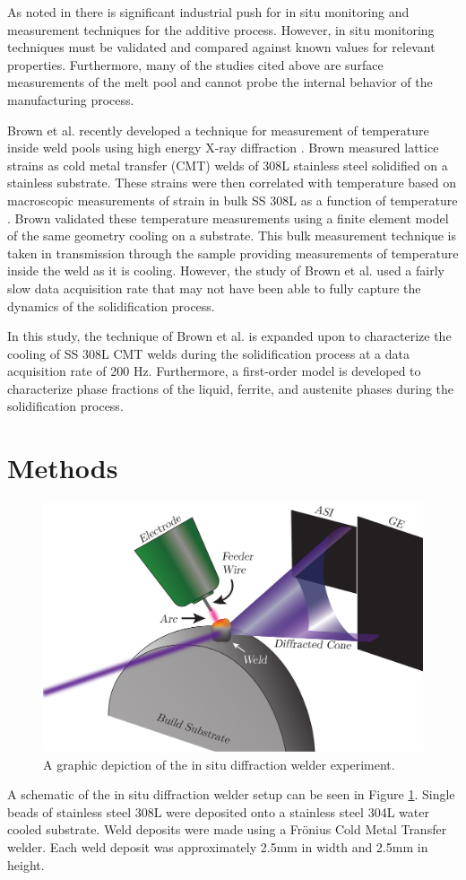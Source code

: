 \documentclass[twocolumn,nofootinbib,notitlepage,aps]{revtex4-1}
\begin{document}
As noted in \cite{Everton2016} there is significant industrial push for in situ monitoring and measurement techniques for the additive process. However, in situ monitoring techniques must be validated and compared against known values for relevant properties. Furthermore, many of the studies cited above are surface measurements of the melt pool and cannot probe the internal behavior of the manufacturing process.

Brown et al. recently developed a technique for measurement of temperature inside weld pools using high energy X-ray diffraction \cite{Brown2019}. Brown measured lattice strains as cold metal transfer (CMT) welds of 308L stainless steel solidified on a stainless substrate. These strains were then correlated with temperature based on macroscopic measurements of strain in bulk SS 308L as a function of temperature \cite{Touloukian1975}. Brown validated these temperature measurements using a finite element model of the same geometry cooling on a substrate. This bulk measurement technique is taken in transmission through the sample providing measurements of temperature inside the weld as it is cooling. However, the study of Brown et al. used a fairly slow data acquisition rate that may not have been able to fully capture the dynamics of the solidification process. 

In this study, the technique of Brown et al. is expanded upon to characterize the cooling of SS 308L CMT welds during the solidification process at a data acquisition rate of 200 Hz. Furthermore, a first-order model is developed to characterize phase fractions of the liquid, ferrite, and austenite phases during the solidification process.

\section{Methods}

\begin{figure}
	\includegraphics[width=0.75\linewidth]{weld_setup}
	\caption{A graphic depiction of the in situ diffraction welder experiment.}
	\label{weldsetup}
\end{figure}
A schematic of the in situ diffraction welder setup can be seen in Figure \ref{weldsetup}. Single beads of stainless steel 308L were deposited onto a stainless steel 304L water cooled substrate. Weld deposits were made using a Fr\"onius Cold Metal Transfer welder. Each weld deposit was approximately 2.5mm in width and 2.5mm in height. 
\end{document}
